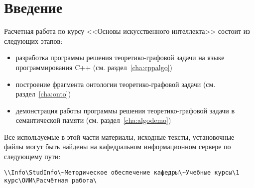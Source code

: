 

{}
\section*{Введение}
\label{sec:oii_intro}

Расчетная работа по курсу <<Основы искусственного интеллекта>> состоит
из следующих этапов:

\begin{itemize}
\item разработка программы решения теоретико-графовой задачи на языке программирования C++
  (см. раздел~\ref{cha:cppalgo})
\item построение фрагмента онтологии теоретико-графовой задачи
  (см. раздел~\ref{cha:onto})
\item демонстрация работы программы решения теоретико-графовой задачи
  в семантической памяти (см. раздел~\ref{cha:algodemo})
\end{itemize}

Все используемые в этой части материалы, исходные тексты, установочные
файлы могут быть найдены на кафедральном информационном
сервере по следующему пути:

{\footnotesize
\begin{verbatim}
\\Info\StudInfo\~Методическое обеспечение кафедры\~Учебные курсы\1 курс\ОИИ\Расчётная работа\
\end{verbatim}
}


